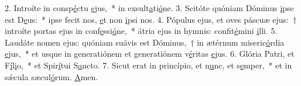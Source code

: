 2. Introíte in consp\uline{é}ctu \uline{e}jus,~* in exsult\uline{a}ti\uline{ó}ne.
3. Scitóte quóniam Dóminus \uline{i}pse est D\uline{e}us:~* ipse fecit nos, \uline{e}t non \uline{i}psi nos.
4. Pópulus ejus, et oves páscuæ ejus:~† introíte portas ejus in conf\uline{e}ssi\uline{ó}ne,~* átria ejus in hymnis: confit\uline{é}mini \uline{i}lli.
5. Laudáte nomen ejus: quóniam suávis est Dóminus,~† in ætérnum miseric\uline{ó}rdia \uline{e}jus,~* et usque in generatiónem et generatiónem v\uline{é}ritas \uline{e}jus.
6. Glória Patri, et F\uline{í}l\uline{i}o,~* et Spir\uline{í}tui S\uline{a}ncto.
7. Sicut erat in princípio, et n\uline{u}nc, et s\uline{e}mper,~* et in sǽcula sæcul\uline{ó}rum. \uline{A}men.
